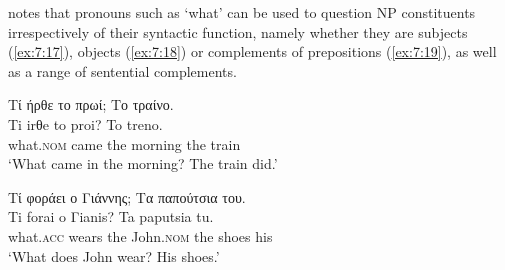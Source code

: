 \documentclass[output=paper]{langsci/langscibook}
\begin{document}
\begin{exe}
\ex \label{ex:7:15}
\begin{xlist}
\end{xlist}
\end{exe}

\begin{exe}
\ex \label{ex:7:16}
\begin{xlist}
\end{xlist}
\end{exe}
\citet{radford1988} notes that pronouns such as `what' can be used to question NP constituents irrespectively of their syntactic function, namely whether they are subjects (\ref{ex:7:17}), objects (\ref{ex:7:18}) or complements of prepositions (\ref{ex:7:19}),  as well as a range of sentential complements. 


\ea%
    \label{ex:7:17}
\glll  Τί ήρθε το πρωί; Το τραίνο. \\
Ti irθe to proi? To treno.\\
             what.\textsc{nom} came the morning the train\\
\glt        `What came in the morning? The train did.'
\z

\ea%
    \label{ex:7:18}
\glll Τί φοράει ο  Γιάννης; Τα παπούτσια του. \\
Ti  forai  o Γianis? Ta paputsia tu.\\
            what.\textsc{acc}  wears the John.\textsc{nom} the shoes his\\
\glt       `What does John wear? His shoes.'
\z
\end{document}
